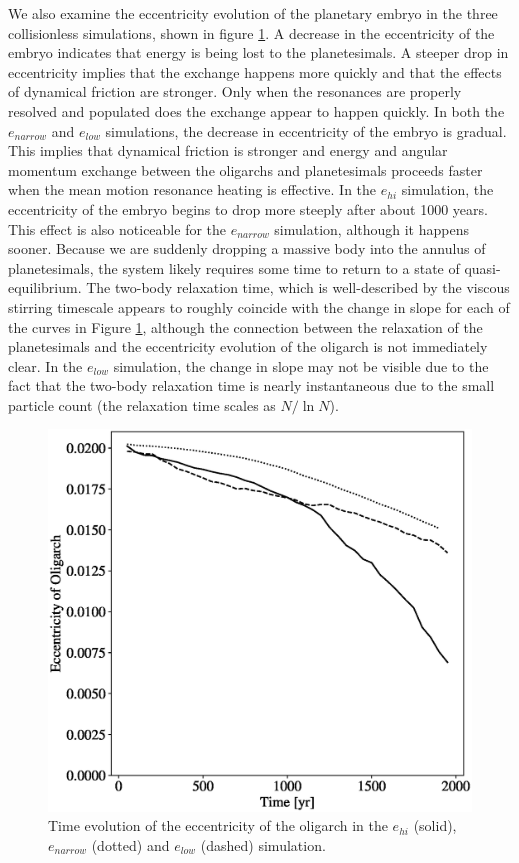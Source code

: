 We also examine the eccentricity evolution of the planetary embryo in the three collisionless simulations, shown in figure 
\ref{fig:e_oli_evo}. A decrease in the eccentricity of the embryo indicates that energy is being lost to the planetesimals. A steeper 
drop in eccentricity implies that the exchange happens more quickly and that the effects of dynamical friction are stronger. Only 
when the resonances are properly resolved and populated does the exchange appear to happen quickly. In both the $e_{narrow}
$ and $e_{low}$ simulations, the decrease in eccentricity of the embryo is gradual. This implies that dynamical friction is stronger 
and energy and angular momentum exchange between the oligarchs and planetesimals proceeds faster when the mean motion 
resonance heating is effective. In the $e_{hi}$ simulation, the eccentricity of the embryo begins to drop more steeply after about 
1000 years. This effect is also noticeable for the $e_{narrow}$ simulation, although it happens sooner. Because we are suddenly 
dropping a massive body into the annulus of planetesimals, the system likely requires some time to return to a state of quasi-
equilibrium. The two-body relaxation time, which is well-described by the viscous stirring timescale \cite{ida93} appears to 
roughly coincide with the change in slope for each of the curves in Figure \ref{fig:e_oli_evo}, although the connection between the 
relaxation of the planetesimals and the eccentricity evolution of the oligarch is not immediately clear. In the $e_{low}$ simulation, 
the change in slope may not be visible due to the fact that the two-body relaxation time is nearly instantaneous due to the small particle count (the relaxation time scales as $N / \ln N$).

\begin{figure}
    \includegraphics[width=\columnwidth]{figures/plSS/hetero_e_oli.eps}
    \caption{Time evolution of the eccentricity of the oligarch in the $e_{hi}$ (solid), $e_{narrow}$ (dotted) and $e_{low}$ (dashed) 
    simulation.}
    \label{fig:e_oli_evo}
\end{figure}

